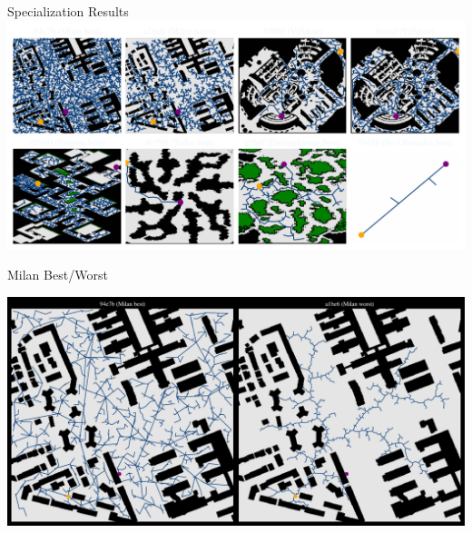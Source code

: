 \documentclass[aspectratio=169]{beamer}
\begin{document}
\begin{frame}{Specialization Results}
    \includegraphics[width=1.0\linewidth, keepaspectratio]{figures/learned.pdf}
\end{frame}

\begin{frame}{Milan Best/Worst}
    
    \includegraphics[width=1.0\linewidth, keepaspectratio]{figures/learned_split_0.pdf}
\end{frame}
\end{document}
